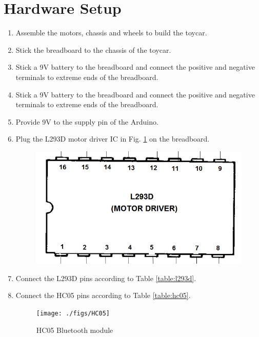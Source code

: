 \documentclass[journal,12pt,twocolumn]{IEEEtran}
\renewcommand\thesection{\arabic{section}}
\begin{document}
\section{Hardware Setup}
%
\begin{enumerate}[label=\thesection.\arabic*
,ref=\thesection.\theenumi]

\item Assemble the motors, chassis and wheels to build the toycar.
%
\item Stick the breadboard to the chassis of the toycar.
%
%

\item Stick a 9V battery to the breadboard and connect the positive and negative 
terminals to extreme ends of the breadboard.
%
\item 
Stick a 9V battery to the breadboard and connect the positive and negative terminals to extreme ends of the breadboard.
%
\item
Provide 9V to the supply pin of the Arduino.
%
\item
Plug the L293D motor driver IC in Fig. \ref{fig:l293d} on the breadboard.

\begin{figure}[!ht]
\begin{center}
\includegraphics[width=\columnwidth]{./figs/l293d}
\end{center}
\caption{}
\label{fig:l293d}
\end{figure}
%
%
\item
Connect the L293D pins according to Table \ref{table:l293d}.

	
\item
Connect the HC05 pins according to Table \ref{table:hc05}.


\begin{figure}[ht!]
\begin{center}
\texttt{[image: ./figs/HC05]}
\end{center}
\caption{HC05 Bluetooth module}
\label{fig:hc05}
\end{figure}

	


\end{enumerate}
%
\end{document}
